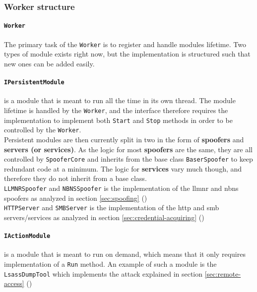\documentclass{article}
\begin{document}

\subsubsection{Worker structure}
\paragraph{\texttt{Worker}} The primary task of the \texttt{Worker} is to register and handle modules lifetime. Two types of module exists right now, but the implementation is structured such that new ones can be added easily.

\paragraph{\texttt{IPersistentModule}} is a module that is meant to run all the time in its own thread. The module lifetime is handled by the \texttt{Worker}, and the interface therefore requires the implementation to implement both \texttt{Start} and \texttt{Stop} methods in order to be controlled by the \texttt{Worker}.
\\
Persistent modules are then currently split in two in the form of \textbf{spoofers} and \textbf{servers (or services)}. As the logic for most \textbf{spoofers} are the same, they are all controlled by \texttt{SpooferCore} and inherits from the base class \texttt{BaserSpoofer} to keep redundant code at a minimum. The logic for \textbf{services} vary much though, and therefore they do not inherit from a base class.
\\
\texttt{LLMNRSpoofer} and \texttt{NBNSSpoofer} is the implementation of the \gls{llmnr} and \gls{nbns} spoofers as analyzed in section \ref{sec:spoofing} ()
\\
\texttt{HTTPServer} and \texttt{SMBServer} is the implementation of the \gls{http} and \gls{smb} servers/services as analyzed in section \ref{sec:credential-acquiring} ()

\paragraph{\texttt{IActionModule}} is a module that is meant to run on demand, which means that it only requires implementation of a \texttt{Run} method. An example of such a module is the \texttt{LsassDumpTool} which implements the attack explained in section \ref{sec:remote-access} ()
\end{document}
